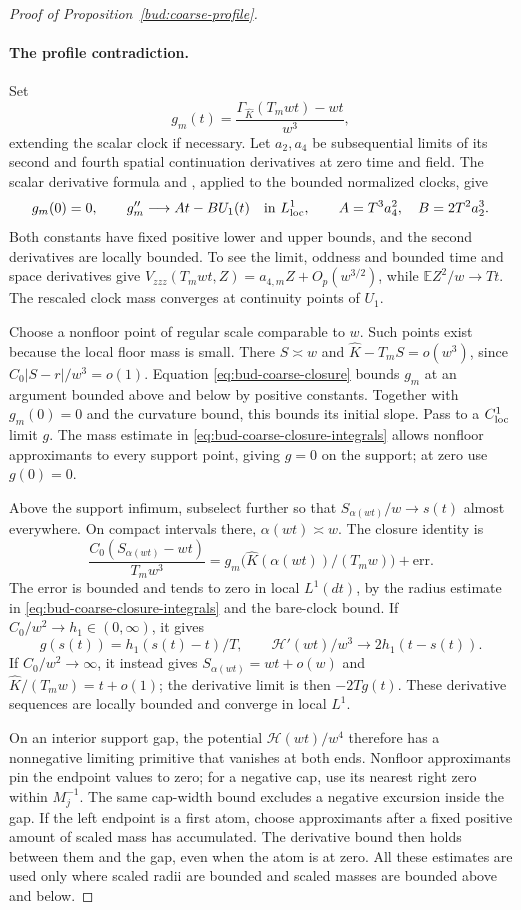 \begin{proof}[Proof of Proposition~\ref{bud:coarse-profile}]
\paragraph{The profile contradiction.}

Set
\[
 g_m(t)=\frac{\Gamma_{\widehat K}(T_mwt)-wt}{w^3},
\]
extending the scalar clock if necessary. Let \(a_2,a_4\) be
subsequential limits of its second and fourth spatial continuation
derivatives at zero time and field. The scalar derivative formula and
\cite[Lemma~5.3]{PE}, applied to the bounded normalized clocks, give
\[
 g_m(0)=0,\qquad g_m''\longrightarrow At-BU_1(t)
       \quad\text{in }L^1_{\rm loc},\qquad
 A=T^3a_4^2,\quad B=2T^2a_2^3.
\]
Both constants have fixed positive lower and upper bounds, and the
second derivatives are locally bounded. To see the limit, oddness and
bounded time and space derivatives give
\(V_{zzz}(T_mwt,Z)=a_{4,m}Z+O_p(w^{3/2})\), while
\(\mathbb EZ^2/w\to Tt\). The rescaled clock mass converges at
continuity points of \(U_1\).

Choose a nonfloor point of regular scale comparable to \(w\).
Such points exist because the local floor mass is small. There
\(S\asymp w\) and \(\widehat K-T_mS=o(w^3)\), since
\(C_0|S-r|/w^3=o(1)\). Equation
\eqref{eq:bud-coarse-closure} bounds \(g_m\) at an argument bounded
above and below by positive constants. Together with \(g_m(0)=0\)
and the curvature bound, this bounds its initial slope. Pass to a
\(C^1_{\rm loc}\) limit \(g\). The mass estimate in
\eqref{eq:bud-coarse-closure-integrals} allows nonfloor approximants
to every support point, giving \(g=0\) on the support; at zero use
\(g(0)=0\).

Above the support infimum, subselect further so that
\(S_{\alpha(wt)}/w\to s(t)\) almost everywhere. On compact
intervals there, \(\alpha(wt)\asymp w\). The closure identity is
\[
 \frac{C_0(S_{\alpha(wt)}-wt)}{T_mw^3}
 =g_m\bigl(\widehat K(\alpha(wt))/(T_mw)\bigr)+\mathrm{err}.
\]
The error is bounded and tends to zero in local \(L^1(dt)\), by the
radius estimate in \eqref{eq:bud-coarse-closure-integrals} and the
bare-clock bound. If \(C_0/w^2\to h_1\in(0,\infty)\), it gives
\[
 g(s(t))=h_1(s(t)-t)/T,\qquad
 \mathcal H'(wt)/w^3\longrightarrow2h_1(t-s(t)).
\]
If \(C_0/w^2\to\infty\), it instead gives
\(S_{\alpha(wt)}=wt+o(w)\) and
\(\widehat K/(T_mw)=t+o(1)\); the derivative limit is then
\(-2Tg(t)\). These derivative sequences are locally bounded and
converge in local \(L^1\).

On an interior support gap, the potential \(\mathcal H(wt)/w^4\)
therefore has a nonnegative limiting primitive that vanishes at both
ends. Nonfloor approximants pin the endpoint values to zero; for a
negative cap, use its nearest right zero within \(M_j^{-1}\).
The same cap-width bound excludes a negative excursion inside the gap.
If the left endpoint is a first atom, choose approximants after a fixed
positive amount of scaled mass has accumulated. The derivative bound
then holds between them and the gap, even when the atom is at zero.
All these estimates are used only where scaled radii are bounded and
scaled masses are bounded above and below.


\end{proof}
